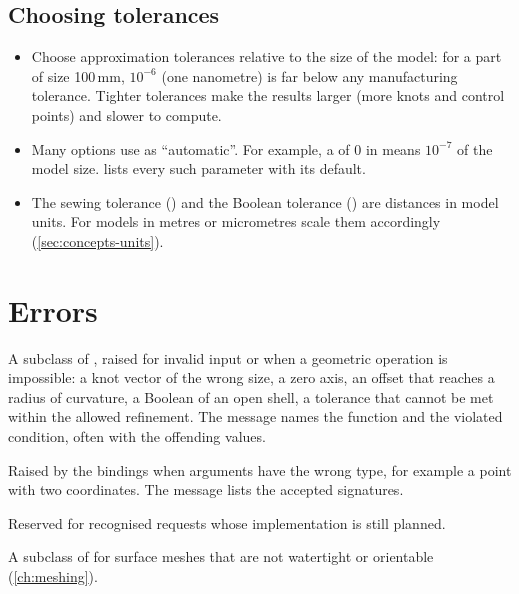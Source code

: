 \subsection{Choosing tolerances}
\begin{itemize}
  \item Choose approximation tolerances relative to the size of the model: for a part of size
    100\,mm, $10^{-6}$ (one nanometre) is far below any manufacturing tolerance. Tighter
    tolerances make the results larger (more knots and control points) and slower to compute.
  \item Many options use  as ``automatic''. For example, a  of 0
    in  means $10^{-7}$ of the model size.
     lists every such parameter with its default.
  \item The sewing tolerance () and the Boolean tolerance
    () are distances in model units. For models in
    metres or micrometres scale them accordingly (\cref{sec:concepts-units}).
\end{itemize}

\section{Errors}\label{sec:concepts-errors}

\begin{description}[style=nextline,leftmargin=1.5em]
  \item[\code{nf.GeometryError}] A subclass of , raised for invalid input or
    when a geometric operation is impossible: a knot vector of the wrong size, a zero axis, an
    offset that reaches a radius of curvature, a Boolean of an open shell, a tolerance that
    cannot be met within the allowed refinement. The message names the function and the
    violated condition, often with the offending values.
  \item[\code{TypeError}] Raised by the bindings when arguments have the wrong type, for example
    a point with two coordinates. The message lists the accepted signatures.
  \item[\code{NotImplementedError}] Reserved for recognised requests whose implementation is
    still planned.
  \item[\code{nurbforge.mesh.MeshTopologyError}] A subclass of  for surface
    meshes that are not watertight or orientable (\cref{ch:meshing}).
\end{description}

